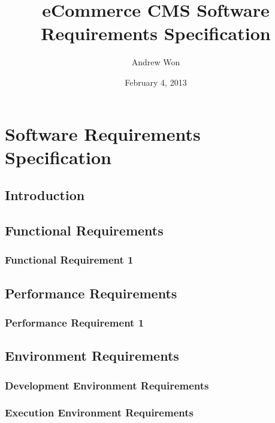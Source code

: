 \documentclass{article}
\title{eCommerce CMS Software Requirements Specification}
\author{Andrew Won}
\date{February 4, 2013}
\begin{document}
\maketitle
\setcounter{section}{4}

\section{Software Requirements Specification}
\subsection{Introduction}
\subsection{Functional Requirements}
\subsubsection{Functional Requirement 1}
\subsection{Performance Requirements}
\subsubsection{Performance Requirement 1}
\subsection{Environment Requirements}
\subsubsection{Development Environment Requirements}
\subsubsection{Execution Environment Requirements}
\end{document}
